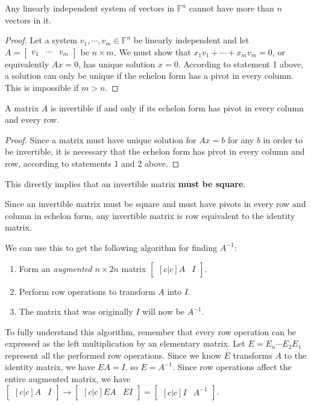 \begin{theorem}
Any linearly independent system of vectors in $\mathbb{F}^{n}$ cannot have more than $n$ vectors in it. 
\end{theorem}

\begin{proof}
Let a system $v_{1}, \cdots, v_{m} \in \mathbb{F}^{n}$ be linearly independent and let $A = \begin{bmatrix}
v_{1} & \cdots & v_{m}
\end{bmatrix}$ be $n \times m$. We must show that $x_{1} v_{1} + \cdots + x_{m} v_{m}= 0$, or equivalently $Ax = 0$, has unique solution $x = 0$. According to statement 1 above, a solution can only be unique if the echelon form has a pivot in every column. This is impossible if $m > n$.  
\end{proof}

\begin{theorem}
A matrix $A$ is invertible if and only if its echelon form has pivot in every column and every row. 
\end{theorem}

\begin{proof}
Since a matrix must have unique solution for $Ax = b$ for any $b$ in order to be invertible, it is necessary that the echelon form has pivot in every column and row, according to statements 1 and 2 above. 
\end{proof}
This directly implies that an invertible matrix \textbf{must be square}.

Since an invertible matrix must be square and must have pivots in every row and column in echelon form, any invertible matrix is row equivalent to the identity matrix. 

We can use this to get the following algorithm for finding $A^{-1}$:
\begin{enumerate}
	\item Form an \textit{augmented $n \times 2n$} matrix 
	$\begin{bmatrix}[c|c] A & I\end{bmatrix}$.
	\item Perform row operations to transform $A$ into $I$.
	\item The matrix that was originally $I$ will now be $A^{-1}$.
\end{enumerate}

To fully understand this algorithm, remember that every row operation can be expressed as the left multiplication by an elementary matrix. Let $E = E_{n} \cdots E_{2} E_{1}$ represent all the performed row operations. Since we know $E$ transforms $A$ to the identity matrix, we have $EA = I$, so $E = A^{-1}$. Since row operations affect the entire augmented matrix, we have $\begin{bmatrix}[c|c]
A & I
\end{bmatrix} \rightarrow \begin{bmatrix}[c|c]
EA & EI
\end{bmatrix} = \begin{bmatrix}[c|c]
I & A^{-1}
\end{bmatrix}$. 

